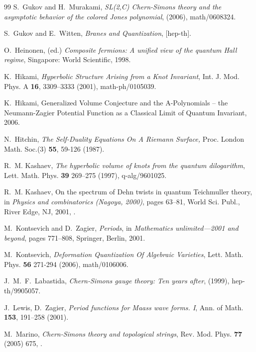 \documentclass[hyper]{JHEP3}
\begin{document}
\begin{thebibliography}{99}
S.~Gukov and H.~Murakami,
\textsl{ SL(2,C) Chern-Simons theory and the asymptotic behavior of the colored Jones polynomial},
\newblock (2006), {math/0608324}.

S.~Gukov and E.~Witten,
\textsl{ Branes and Quantization},
 [hep-th].

O.~Heinonen, (ed.) \newblock \textsl{ Composite fermions:
A unified view of the quantum Hall regime},
\newblock Singapore: World Scientific, 1998.

K.~Hikami, \textsl{ Hyperbolic Structure Arising from a Knot Invariant},
\newblock Int. J. Mod. Phys. A \textbf{ 16}, 3309--3333 (2001), {math-ph/0105039}.

K.~Hikami,
\newblock Generalized Volume Conjecture and the A-Polynomials -- the Neumann-Zagier
Potential Function as a Classical Limit of Quantum Invariant, 2006.

N.~Hitchin, \textsl{ The Self-Duality Equations On A Riemann Surface,}
\newblock Proc. London Math. Soc.(3) \textbf{ 55}, 59-126 (1987).

R.~M. Kashaev, \textsl{ The hyperbolic volume of knots from the quantum dilogarithm},
\newblock Lett. Math. Phys. \textbf{ 39} 269--275 (1997), {q-alg/9601025}.

R.~M. Kashaev,
\newblock On the spectrum of Dehn twists in quantum Teichmuller theory,
\newblock in \textsl{ Physics and combinatorics (Nagoya, 2000)},
pages 63--81, World Sci. Publ., River Edge, NJ, 2001,
.

M.~Kontsevich and D.~Zagier, \textsl{ Periods},
\newblock in \textsl{ Mathematics unlimited---2001 and beyond},
pages 771--808, Springer, Berlin, 2001.

M.~Kontsevich, \textsl{ Deformation Quantization Of Algebraic Varieties},
\newblock Lett. Math. Phys. \textbf{ 56} 271-294 (2006), {math/0106006}.

J.~M.~F.~Labastida, \textsl{ Chern-Simons gauge theory: Ten years after},
\newblock (1999), {hep-th/9905057}.

J.~Lewis, D.~Zagier, \textsl{ Period functions for Maass wave forms. I},
\newblock Ann. of Math. \textbf{ 153}, 191--258 (2001).

M.~Marino, \textsl{ Chern-Simons theory and topological strings},
\newblock Rev. Mod. Phys. \textbf{77} (2005) 675,
.


\end{thebibliography}
\end{document}
